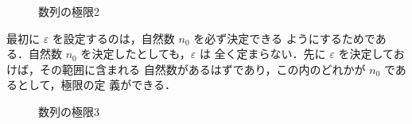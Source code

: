                     \begin{figure}[hbt]
                        \begin{center}
                           \caption{数列の極限2}
                           \label{fig:suretu_kyokugen2}
                        \end{center}
                    \end{figure}

                最初に $\varepsilon$ を設定するのは，自然数 $n_{0}$ を必ず決定できる
                ようにするためである．自然数 $n_{0}$ を決定したとしても，$\varepsilon$ は
                全く定まらない．先に $\varepsilon$ を決定しておけば，その範囲に含まれる
                自然数があるはずであり，この内のどれかが $n_{0}$ であるとして，極限の定
                義ができる．

                    \begin{figure}[hbt]
                        \begin{center}
                            \caption{数列の極限3}
                            \label{fig:suretu_kyokugen3}
                        \end{center}
                    \end{figure}


